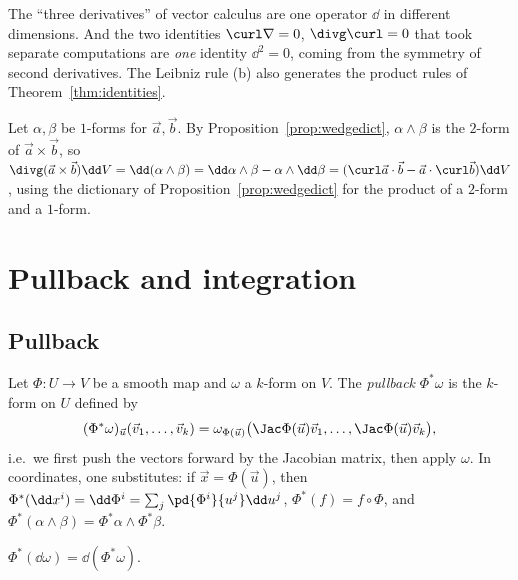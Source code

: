\begin{intuition}
The ``three derivatives'' of vector calculus are one operator $\dd$ in different dimensions. And the two identities $\curl\nabla=0$, $\divg\curl=0$ that took separate computations are \emph{one} identity $\dd^2=0$, coming from the symmetry of second derivatives. The Leibniz rule (b) also generates the product rules of Theorem~\ref{thm:identities}.
\end{intuition}

\begin{example}[The identity $\divg(\vec a\times\vec b)=\vec b\cdot\curl\vec a-\vec a\cdot\curl\vec b$]
Let $\alpha,\beta$ be $1$-forms for $\vec a,\vec b$. By Proposition~\ref{prop:wedgedict}, $\alpha\wedge\beta$ is the $2$-form of $\vec a\times\vec b$, so $\divg(\vec a\times\vec b)\dd V=\dd(\alpha\wedge\beta)=\dd\alpha\wedge\beta-\alpha\wedge\dd\beta=(\curl\vec a\cdot\vec b-\vec a\cdot\curl\vec b)\dd V$, using the dictionary of Proposition~\ref{prop:wedgedict} for the product of a $2$-form and a $1$-form.
\end{example}

\section{Pullback and integration}

\subsection{Pullback}

Let $\Phi:U\to V$ be a smooth map and $\omega$ a $k$-form on $V$. The \emph{pullback} $\Phi^*\omega$ is the $k$-form on $U$ defined by
\[
(\Phi^*\omega)_{\vec u}(\vec v_1,\dots,\vec v_k)=\omega_{\Phi(\vec u)}\bigl(\Jac\Phi(\vec u)\vec v_1,\dots,\Jac\Phi(\vec u)\vec v_k\bigr),
\]
i.e.\ we first push the vectors forward by the Jacobian matrix, then apply $\omega$. In coordinates, one substitutes: if $\vec x=\Phi(\vec u)$, then $\Phi^*(\dd x^i)=\dd\Phi^i=\sum_j\pd{\Phi^i}{u^j}\dd u^j$, $\Phi^*(f)=f\circ\Phi$, and $\Phi^*(\alpha\wedge\beta)=\Phi^*\alpha\wedge\Phi^*\beta$.

\begin{theorem}\label{thm:pullbackd}
$\Phi^*(\dd\omega)=\dd(\Phi^*\omega)$.
\end{theorem}

